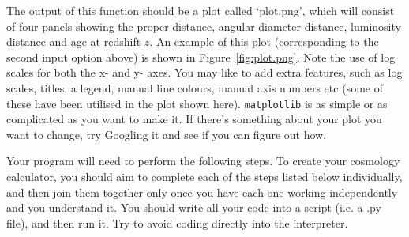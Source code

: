 \documentclass[]{article}
\begin{document}
\begin{figure*}[t!]
\caption{An example output for \texttt{cosmo.py}. The purple line is the user specified input, and is based on the second example input shown above.}
\label{fig:plot.png}
\end{figure*}

\noindent The output of this function should be a plot called `plot.png', which will consist of four panels showing the proper distance, angular diameter distance, luminosity distance and age at redshift $z$. An example of this plot (corresponding to the second input option above) is shown in Figure~\ref{fig:plot.png}. Note the use of log scales for both the x- and y- axes. You may like to add extra features, such as log scales, titles, a legend, manual line colours, manual axis numbers etc (some of these have been utilised in the plot shown here). \texttt{matplotlib} is as simple or as complicated as you want to make it. If there's something about your plot you want to change, try Googling it and see if you can figure out how. \\


\noindent Your program will need to perform the following steps. To create your cosmology calculator, you should aim to complete each of the steps listed below individually, and then join them together only once you have each one working independently and you understand it. You should write all your code into a script (i.e. a .py file), and then run it. Try to avoid coding directly into the interpreter. 
\end{document}
